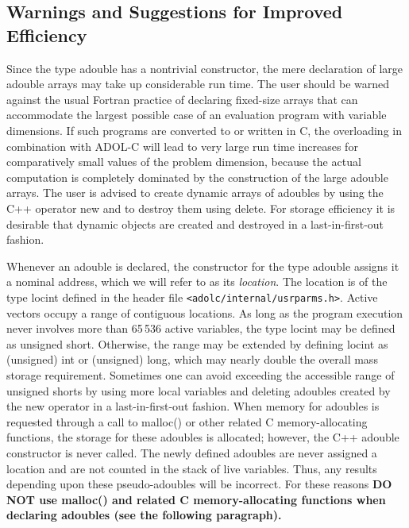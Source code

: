 \documentclass[11pt,twoside]{article}
\begin{document}
\subsection{Warnings and Suggestions for Improved Efficiency}
\label{WarSug}
%
Since the type {\sf adouble} has a nontrivial constructor,
the mere declaration of large {\sf adouble} arrays may take up
considerable run time. The user should be warned against
the usual Fortran practice of declaring fixed-size arrays
that can accommodate the largest possible case of an evaluation program
with variable dimensions. If such programs are converted to or written
in C, the overloading in combination with ADOL-C will lead to very
large run time increases for comparatively small values of the
problem dimension, because the actual computation is completely
dominated by the construction of the large {\sf adouble} arrays.
The user is advised to 
create dynamic arrays of
{\sf adouble}s by using the C++ operator {\sf new} and to destroy them
using {\sf delete}. For storage efficiency it is desirable that
dynamic objects are created and destroyed in a last-in-first-out
fashion. 

Whenever an {\sf adouble} is declared, the constructor for the type
{\sf adouble} assigns it a nominal address, which we will refer to as
its  {\em location}.  The location is of the type {\sf locint} defined
in the header file \verb=<adolc/internal/usrparms.h>=. Active vectors occupy
a range of contiguous locations. As long as the program execution
never involves more than 65$\,$536 active variables, the type {\sf locint}
may be defined as {\sf unsigned short}. Otherwise, the range may be
extended by defining {\sf locint} as {\sf (unsigned) int} or
{\sf (unsigned) long}, which may nearly double
the overall mass storage requirement. Sometimes one can avoid exceeding
the accessible range of {\sf unsigned short}s by using more local variables and deleting
{\sf adouble}s  created by the new operator in a
last-in-first-out
fashion.  When memory for {\sf adouble}s is requested through a call to
{\sf malloc()} or other related C memory-allocating
functions, the storage for these {\sf adouble}s is allocated; however, the
C++ {\sf adouble} constructor is never called.  The newly defined
{\sf adouble}s are never assigned a location and are not counted in
the stack of live variables. Thus, any results depending upon these
pseudo-{\sf adouble}s will be incorrect. For these reasons {\bf DO NOT use
  malloc() and related C memory-allocating 
functions when declaring adoubles (see the following paragraph).}
%
%
\end{document}
